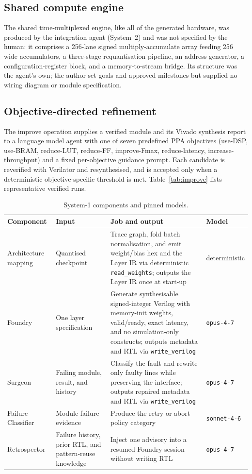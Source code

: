 \documentclass[acmtog,authorversion]{acmart}
\begin{document}
\subsection{Shared compute engine}\label{app:engine}

The shared time-multiplexed engine, like all of the generated hardware, was produced by the integration agent (System~2) and was not specified by the human: it comprises a 256-lane signed multiply-accumulate array feeding 256 wide accumulators, a three-stage requantisation pipeline, an address generator, a configuration-register block, and a memory-to-stream bridge. Its structure was the agent's own; the author set goals and approved milestones but supplied no wiring diagram or module specification.

\subsection{Objective-directed refinement}\label{app:improve}

The improve operation supplies a verified module and its Vivado synthesis report to a language model agent with one of seven predefined PPA objectives (use-DSP, use-BRAM, reduce-LUT, reduce-FF, improve-Fmax, reduce-latency, increase-throughput) and a fixed per-objective guidance prompt. Each candidate is reverified with Verilator and resynthesised, and is accepted only when a deterministic objective-specific threshold is met. Table~\ref{tab:improve} lists representative verified runs.

\begin{table}[!htbp]
\centering
\caption{System-1 components and pinned models.}
\label{tab:agents}
\setlength{\tabcolsep}{4pt}
\begin{tabular}{@{}p{}p{}p{}p{}@{}}
\toprule
Component & Input & Job and output & Model \\
\midrule
Architecture mapping & Quantised checkpoint & Trace graph, fold batch normalisation, and emit weight/bias hex and the Layer IR via deterministic \texttt{read\_weights}; outputs the Layer IR once at start-up & deterministic \\
Foundry & One layer specification & Generate synthesisable signed-integer Verilog with memory-init weights, valid/ready, exact latency, and no simulation-only constructs; outputs metadata and RTL via \texttt{write\_verilog} & \texttt{opus-4-7} \\
Surgeon & Failing module, result, and history & Classify the fault and rewrite only faulty lines while preserving the interface; outputs repaired metadata and RTL via \texttt{write\_verilog} & \texttt{opus-4-7} \\
Failure-Classifier & Module failure evidence & Produce the retry-or-abort policy category & \texttt{sonnet-4-6} \\
Retrospector & Failure history, prior RTL, and pattern-reuse knowledge & Inject one advisory into a resumed Foundry session without writing RTL & \texttt{opus-4-7} \\
\bottomrule
\end{tabular}
\end{table}
\end{document}
